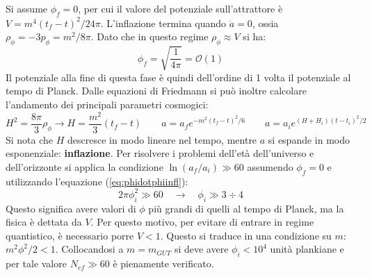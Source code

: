 Si assume $\phi_f = 0$, per cui il valore del potenziale sull'attrattore è $V= m^4 (t_f-t)^2 / 24 \pi$. L'inflazione termina quando $\ddot{a}=0$, ossia $\rho_\phi = -3p_\phi = m^2 / 8 \pi$. Dato che in questo regime $\rho_\phi \approx V$ si ha:
$$
\phi_f = \sqrt{\frac{1}{4\pi}}= \mathcal{O}(1)
$$
Il potenziale alla fine di questa fase è quindi dell'ordine di 1 volta il potenziale al tempo di Planck. Dalle equazioni di Friedmann si può inoltre calcolare l'andamento dei principali parametri cosmogici:
\begin{equation}
    H^2 = \frac{8\pi }{3}\rho_\phi \rightarrow H = \frac{m^2}{3} (t_f -t) \qquad a=a_f e^{-m^2 (t_f-t)^2 /6} \qquad a=a_i e^{(H+H_i)(t-t_i)^2 /2}
\end{equation}
Si nota che $H$ descresce in modo lineare nel tempo, mentre $a$ si espande in modo esponenziale: \textbf{inflazione}. Per risolvere i problemi dell'età dell'universo e dell'orizzonte si applica la condizione $\ln (a_f/a_i) \gg 60$ assumendo $\phi_f = 0$ e utilizzando l'equazione (\ref{eq:phidotphiinfl}):
\begin{equation}
    2 \pi \phi_i^2 \gg 60 \quad \rightarrow \quad \phi_i \gg 3 \div 4
\end{equation}
Questo significa avere valori di $\phi$ più grandi di quelli al tempo di Planck, ma la fisica è dettata da $V$. Per questo motivo, per evitare di entrare in regime quantistico, è necessario porre $V<1$. Questo si traduce in una condizione su $m$: $m^2 \phi^2 /2 <1$. Collocandosi a $m=m_{GUT}$ si deve avere $\phi_i < 10^4$ unità plankiane e per tale valore  $N_{ef} \gg 60$ è pienamente verificato.

